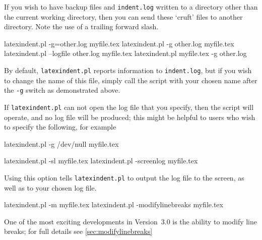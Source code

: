  If you wish to have backup files and \texttt{indent.log} written to a directory other
 than the current working directory, then you can send these `cruft' files to another
 directory. Note the use of a trailing forward slash. %

 \begin{commandshell}
latexindent.pl -g=other.log myfile.tex
latexindent.pl -g other.log myfile.tex
latexindent.pl --logfile other.log myfile.tex
latexindent.pl myfile.tex -g other.log 
\end{commandshell}

 By default, \texttt{latexindent.pl} reports information to \texttt{indent.log}, but if
 you wish to change the name of this file, simply call the script with your chosen name
 after the \texttt{-g} switch as demonstrated above.

  If \texttt{latexindent.pl} can not open
 the log file that you specify, then the script will operate, and no log file will be
 produced; this might be helpful to users who wish to specify the following, for example
 \begin{commandshell}
latexindent.pl -g /dev/null myfile.tex
\end{commandshell}

 \begin{commandshell}
latexindent.pl -sl myfile.tex
latexindent.pl -screenlog myfile.tex
\end{commandshell}
 Using this  option tells
 \texttt{latexindent.pl} to output the log file to the screen, as well as to your chosen
 log file.%

 \begin{commandshell}
latexindent.pl -m myfile.tex
latexindent.pl -modifylinebreaks myfile.tex
\end{commandshell}

 One of the most exciting developments in Version~3.0 is the ability to modify line
 breaks; for full details see \vref{sec:modifylinebreaks}

